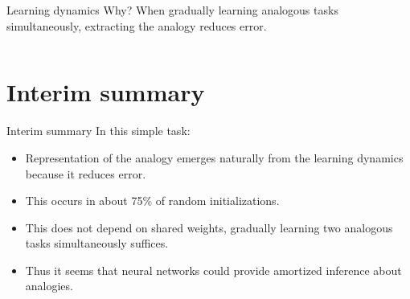 \documentclass{beamer}
\begin{document}
\begin{frame}{Learning dynamics}
Why? When gradually learning analogous tasks simultaneously, extracting the analogy reduces error. \\[11pt]
\begin{columns}
\end{columns} 

\end{frame}

\section{Interim summary}
\begin{frame}{Interim summary}
 In this simple task:
\begin{itemize}
    \item<2-> Representation of the analogy emerges naturally from the learning dynamics because it reduces error.
    \item<3-> This occurs in about 75\% of random initializations.
    \item<4-> This does not depend on shared weights, gradually learning two analogous tasks simultaneously suffices.
    \item<5-> Thus it seems that neural networks could provide amortized inference about analogies. 
\end{itemize}
\end{frame}
\end{document}
